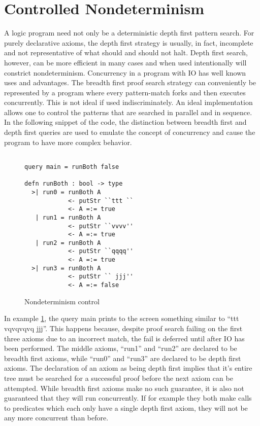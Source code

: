 \section{Controlled Nondeterminism}

A logic program need not only be a deterministic depth first pattern search. For purely declarative 
axioms, the depth first strategy is usually, in fact, incomplete 
and not representative of what should and should not halt.
Depth first search, however, can be more efficient in many cases and when used intentionally
will constrict nondeterminism. Concurrency in a program with IO has
well known uses and advantages. The breadth first proof search strategy can conveniently
be represented by a program where every pattern-match forks and then executes
concurrently. This is not ideal if used indiscriminately. An ideal implementation
allows one to control the patterns that are searched in parallel and in sequence. 
In the following snippet of the code, the distinction between
breadth first and depth first queries are used to emulate the concept of concurrency and
cause the program to have more complex behavior.

\begin{figure}[H]
\begin{lstlisting}

query main = runBoth false

defn runBoth : bool -> type
  >| run0 = runBoth A
            <- putStr ``ttt ``
            <- A =:= true
   | run1 = runBoth A 
            <- putStr ``vvvv''
            <- A =:= true
   | run2 = runBoth A
            <- putStr ``qqqq''
            <- A =:= true
  >| run3 = runBoth A
            <- putStr `` jjj''
            <- A =:= false

\end{lstlisting}
\caption{Nondeterminism control}
\label{nondet:ex1}
\end{figure}

In example \ref{nondet:ex1}, the query main prints to the screen something similar to “ttt
vqvqvqvq jjj”. This happens because, despite proof search failing on the first three axioms due
to an incorrect match, the fail is deferred until after IO has been performed. The middle
axioms, ``run1'' and ``run2'' are declared to be breadth first axioms, while ``run0'' and ``run3'' are
declared to be depth first axioms.  
The declaration of an axiom as being depth first implies that it's entire tree must be searched for a successful
proof before the next axiom can be attempted.  While breadth first axioms make no such guarantee, 
it is also not guaranteed that they will run concurrently.  
If for example they both make calls to predicates which each only have a single depth first axiom, they will not be
any more concurrent than before.  


